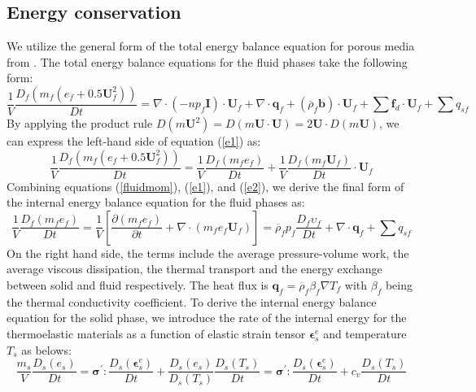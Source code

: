 \documentclass[preprint,12pt]{elsarticle}
\begin{document}
\subsection{\textsf{Energy conservation}}
We utilize the general form of the total energy balance equation for porous media from \cite{Hassanizadeh}. The total energy balance equations for the fluid phases take the following form:
%
%
\begin{equation}
\label{e1}
     \frac{1}{V}\frac{D_f(m_f (e_f+0.5\pmb{U}_f^2))}{Dt} = \nabla \cdot (-np_f\pmb{I}) \cdot \pmb{U}_f + \nabla \cdot \pmb{q}_f + (\overline{\rho}_f \pmb{b}) \cdot \pmb{U}_f +  \sum \pmb{f}_{d} \cdot \pmb{U}_f +  \sum q_{sf}
\end {equation}
%
%
By applying the product rule $D(m\pmb{U}^2)=D(m \pmb{U} \cdot \pmb{U}) = 2 \pmb{U} \cdot D(m \pmb{U})$, we can express the left-hand side of equation (\ref{e1}) as:
%
%
\begin{equation}
\label{e2}
     \frac{1}{V}\frac{D_f(m_f (e_f+0.5\pmb{U}_f^2))}{Dt}  = \frac{1}{V}\frac{D_f(m_f e_f)}{Dt} + \frac{1}{V}\frac{D_f(m_f \pmb{U}_f)}{Dt} \cdot \pmb{U}_f 
\end {equation}
%
%
Combining equations (\ref{fluidmom}), (\ref{e1}), and (\ref{e2}), we derive the final form of the internal energy balance equation for the fluid phases as:
%
%
\begin{equation}
     \frac{1}{V}\frac{D_f(m_f e_f)}{Dt} = \frac{1}{V} \left[ \frac{\partial (m_f e_f)}{\partial t} + \nabla \cdot  (m_f e_f \pmb{U}_f) \right] 
   = \overline{\rho}_f p_f  \frac{D_f\upsilon_f}{Dt} + \nabla \cdot \pmb{q}_f +  \sum q_{sf}
\end {equation}
%
%
On the right hand side, the terms include the average pressure-volume work, the average viscous dissipation, the thermal transport and the energy exchange between solid and fluid respectively. The heat flux is $\pmb{q}_f = \overline{\rho}_f \beta_f \nabla T_f$ with $\beta_f$ being the thermal conductivity coefficient. To derive the internal energy balance equation for the solid phase, we introduce the rate of the internal energy  for the thermoelastic materials as a function of elastic strain tensor $\pmb{\epsilon}_s^e$ and temperature $T_s$ as belows:
%
%
\begin{equation}
   \frac{m_s}{V} \frac{D_s( e_s)}{Dt} = \pmb{\sigma}^\prime :\frac{D_s( \pmb{\epsilon}_s^e)}{Dt} + \frac{D_s( e_s)}{D_s (T_s)} \frac{D_s( T_s)}{Dt} = \pmb{\sigma}^\prime :\frac{D_s( \pmb{\epsilon}_s^e)}{Dt} + c_v \frac{D_s( T_s)}{Dt}
\label{internalEnergy}
\end {equation}
\end{document}
